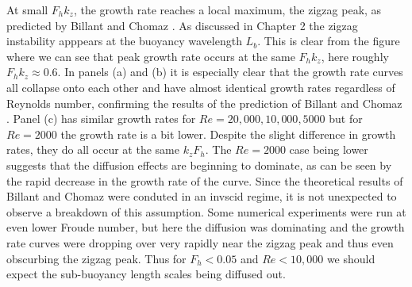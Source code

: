 At small $F_{h}k_{z}$, the growth rate reaches a local maximum, the zigzag peak, as predicted by Billant and Chomaz \cite{bc2000a,bc2000b,bc2000c}.  As discussed in Chapter 2 the zigzag instability apppears at the buoyancy wavelength $L_{b}$. This is clear from the figure where we can see that peak growth rate occurs at the same $F_{h}k_{z}$, here roughly $F_{h}k_{z}\approx 0.6$. In panels (a) and (b) it is especially clear that the growth rate curves all collapse onto each other and have almost identical growth rates regardless of Reynolds number, confirming the results of the prediction of Billant and Chomaz \cite{bc2000b,bc2000c}. Panel (c) has similar growth rates for $Re=20{,}000,10{,}000,5000$ but for $Re=2000$ the growth rate is a bit lower. Despite the slight difference in growth rates, they do all occur at the same $k_{z}F_{h}$. The $Re=2000$ case being lower suggests that the diffusion effects are beginning to dominate, as can be seen by the rapid decrease in the growth rate of the curve. Since the theoretical results of Billant and Chomaz \cite{bc2000b} were conduted in an invscid regime, it is not unexpected to observe a breakdown of this assumption. Some numerical experiments were run at even lower Froude number, but here the diffusion was dominating and the growth rate curves were dropping over very rapidly near the zigzag peak and thus even obscurbing the zigzag peak. Thus for $F_{h}<0.05$ and $Re<10{,}000$ we should expect the sub-buoyancy length scales being diffused out. 

